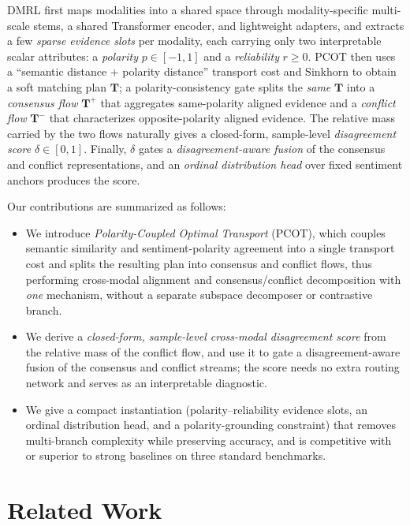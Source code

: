 \documentclass[conference]{IEEEtran}
\begin{document}
DMRL first maps modalities into a shared space through modality-specific
multi-scale stems, a shared Transformer encoder, and lightweight adapters, and
extracts a few \emph{sparse evidence slots} per modality, each carrying only two
interpretable scalar attributes: a \emph{polarity} $p\in[-1,1]$ and a
\emph{reliability} $r\ge 0$. PCOT then uses a ``semantic distance + polarity
distance'' transport cost and Sinkhorn to obtain a soft matching plan $\mathbf{T}$;
a polarity-consistency gate splits the \emph{same} $\mathbf{T}$ into a
\emph{consensus flow} $\mathbf{T}^{+}$ that aggregates same-polarity aligned
evidence and a \emph{conflict flow} $\mathbf{T}^{-}$ that characterizes
opposite-polarity aligned evidence. The relative mass carried by the two flows
naturally gives a closed-form, sample-level \emph{disagreement score}
$\delta\in[0,1]$. Finally, $\delta$ gates a \emph{disagreement-aware fusion} of the
consensus and conflict representations, and an \emph{ordinal distribution head}
over fixed sentiment anchors produces the score.

Our contributions are summarized as follows:
\begin{itemize}
\item We introduce \emph{Polarity-Coupled Optimal Transport} (PCOT), which couples
semantic similarity and sentiment-polarity agreement into a single transport cost
and splits the resulting plan into consensus and conflict flows, thus performing
cross-modal alignment and consensus/conflict decomposition with \emph{one}
mechanism, without a separate subspace decomposer or contrastive branch.
\item We derive a \emph{closed-form, sample-level cross-modal disagreement score}
from the relative mass of the conflict flow, and use it to gate a
disagreement-aware fusion of the consensus and conflict streams; the score needs no
extra routing network and serves as an interpretable diagnostic.
\item We give a compact instantiation (polarity--reliability evidence slots, an
ordinal distribution head, and a polarity-grounding constraint) that removes
multi-branch complexity while preserving accuracy, and is competitive with or
superior to strong baselines on three standard benchmarks.
\end{itemize}

\section{Related Work}
\end{document}
